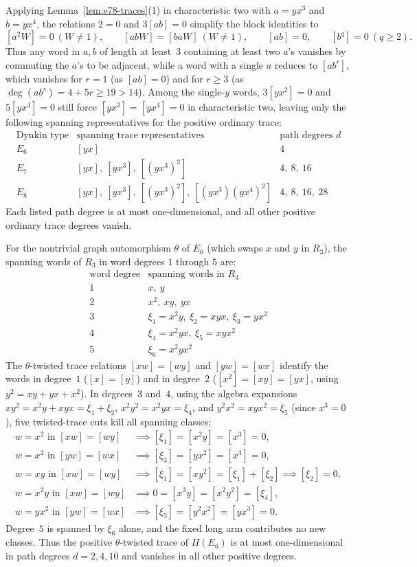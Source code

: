 Applying Lemma~\ref{lem:e78-traces}(1) in characteristic two with $a=yx^3$ and $b=yx^4$, the relations $2=0$ and $3[ab]=0$ simplify the block identities to
\[
  [a^2W]=0\ (W\ne1),\qquad [abW]=[baW]\ (W\ne1),\qquad [ab]=0,\qquad [b^q]=0\ (q\geq2).
\]
Thus any word in $a,b$ of length at least~$3$ containing at least two $a$'s vanishes by commuting the $a$'s to be adjacent, while a word with a single $a$ reduces to $[ab^r]$, which vanishes for $r=1$ (as $[ab]=0$) and for $r\geq3$ (as $\deg(ab^r)=4+5r\geq19>14$). Among the single-$y$ words, $3[yx^2]=0$ and $5[yx^4]=0$ still force $[yx^2]=[yx^4]=0$ in characteristic two, leaving only the following spanning representatives for the positive ordinary trace:
\[
  \begin{array}{c|c|c}
  \text{Dynkin type}&\text{spanning trace representatives}&\text{path degrees }d\\ \hline
  E_6&[yx]&4\\
  E_7&[yx],\ [yx^3],\ [(yx^3)^2]&4,\ 8,\ 16\\
  E_8&[yx],\ [yx^3],\ [(yx^3)^2],\ [(yx^3)(yx^4)^2]&4,\ 8,\ 16,\ 28
  \end{array}
\]
Each listed path degree is at most one-dimensional, and all other positive ordinary trace degrees vanish.

For the nontrivial graph automorphism $\theta$ of $E_6$ (which swaps $x$ and $y$ in $R_3$), the spanning words of $R_3$ in word degrees $1$ through $5$ are:
\[
  \begin{array}{c|l}
  \text{word degree}& \text{spanning words in }R_3\\ \hline
  1&x,\ y\\
  2&x^2,\ xy,\ yx\\
  3&\xi_1=x^2y,\ \xi_2=xyx,\ \xi_3=yx^2\\
  4&\xi_4=x^2yx,\ \xi_5=xyx^2\\
  5&\xi_6=x^2yx^2
  \end{array}
\]
The $\theta$-twisted trace relations $[xw]=[wy]$ and $[yw]=[wx]$ identify the words in degree~$1$ ($[x]=[y]$) and in degree~$2$ ($[x^2]=[xy]=[yx]$, using $y^2=xy+yx+x^2$). In degrees~$3$ and~$4$, using the algebra expansions $xy^2=x^2y+xyx=\xi_1+\xi_2$, $x^2y^2=x^2yx=\xi_4$, and $y^2x^2=xyx^2=\xi_5$ (since $x^3=0$), five twisted-trace cuts kill all spanning classes:
\begin{align*}
  w=x^2\text{ in }[xw]=[wy]&\implies [\xi_1]=[x^2y]=[x^3]=0,\\
  w=x^2\text{ in }[yw]=[wx]&\implies [\xi_3]=[yx^2]=[x^3]=0,\\
  w=xy\text{ in }[xw]=[wy]&\implies [\xi_1]=[xy^2]=[\xi_1]+[\xi_2]\implies [\xi_2]=0,\\
  w=x^2y\text{ in }[xw]=[wy]&\implies 0=[x^3y]=[x^2y^2]=[\xi_4],\\
  w=yx^2\text{ in }[yw]=[wx]&\implies [\xi_5]=[y^2x^2]=[yx^3]=0.
\end{align*}
Degree~$5$ is spanned by $\xi_6$ alone, and the fixed long arm contributes no new classes. Thus the positive $\theta$-twisted trace of $\Pi(E_6)$ is at most one-dimensional in path degrees $d=2,4,10$ and vanishes in all other positive degrees.

